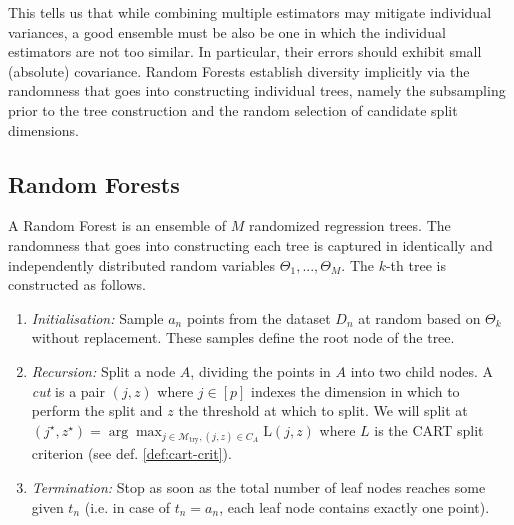 \documentclass[10pt]{article}
\theoremstyle{definition}
\begin{document}
This tells us that while combining multiple estimators may mitigate individual
variances, a good ensemble must be also be one in which the individual
estimators are not too similar.
In particular, their errors should exhibit small (absolute) covariance.
Random Forests establish diversity implicitly via the randomness that goes into
constructing individual trees, namely the subsampling prior to the tree
construction and the random selection of candidate split dimensions.



\subsection{Random Forests}

A Random Forest is an ensemble of $M$ randomized regression trees. The
randomness that goes into constructing each tree is captured in identically and
independently distributed random variables $\Theta_1, ..., \Theta_M$. The $k$-th
tree is constructed as follows.

\begin{enumerate}
\item \textit{Initialisation:} Sample $a_{n}$ points from the dataset $D_{n}$ at
  random based on $\Theta_k$ without replacement. These samples define the root
  node of the tree.
\item \textit{Recursion:} Split a node $A$, dividing the points in $A$ into two
  child nodes. A \textit{cut} is a pair $(j, z)$ where $j \in [p]$ indexes the
  dimension in which to perform the split and $z$ the threshold at which to
  split. We will split at $(j^\star,z^\star) = \arg\max_{j \in
    \mathcal{M}_{\text{try}}, (j, z) \in C_{A}} \text{L}(j, z)$ where $L$ is the
  CART split criterion (see def. \ref{def:cart-crit}).

\item \textit{Termination:} Stop as soon as the total number of leaf nodes reaches some given $t_{n}$ (i.e. in
  case of $t_{n} = a_{n}$, each leaf node contains exactly one point).
\end{enumerate}
\end{document}
